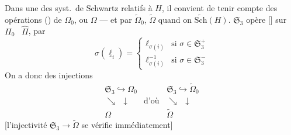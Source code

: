 \documentclass[11pt,a4paper]{article}
\begin{document}
\struck{\ill{}} Dans une  des syst.\ de Schwartz relatifs à $H$, il convient de tenir compte des opérations (\ill{}) de $\Omega_0$, ou $\Omega$ --- et  par $\widetilde{\Omega}_0$, $\widetilde{\Omega}$ quand on  $\widetilde{\mathrm{Sch}}(H)$.
\struck{\ill{}}
$\mathfrak{S}_3$ opère [] sur $\Pi_0$ \ $\widehat{\Pi}$, par
\[
  \sigma(\underline{\ell}_i) =
  \begin{cases}
    \ell_{\sigma(i)} & \text{si } \sigma \in \mathfrak{S}_3^{+} \\
    \ell_{\sigma(i)}^{-1} & \text{si } \sigma \in \mathfrak{S}_3^{-}
  \end{cases}
\]
On a donc des injections
\[
  \begin{array}{ccc}
    \mathfrak{S}_3 \hookrightarrow \Omega_0 & \qquad & \mathfrak{S}_3 \hookrightarrow \widetilde{\Omega}_0 \\
    \searrow \ \ \downarrow & \text{d'où} & \searrow \ \ \downarrow \\
    \Omega & & \widetilde{\Omega}
  \end{array}
\]
[l'injectivité $\mathfrak{S}_3 \to \widetilde{\Omega}$ se vérifie immédiatement]
\end{document}
